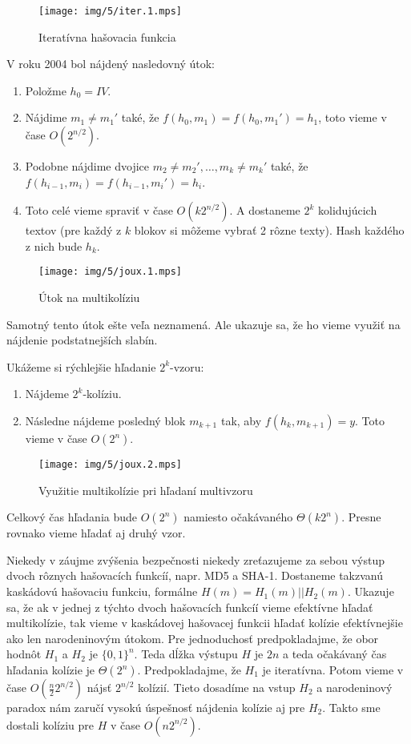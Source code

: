 \begin{figure}[h!]
    \label{fig:iter}
    \centering
    \texttt{[image: img/5/iter.1.mps]}
    \caption{Iteratívna hašovacia funkcia}
\end{figure}


V roku 2004 \cite{Joux04} bol nájdený nasledovný útok:
\begin{enumerate}
\itemsep -1.2mm
\item Položme $h_0 = IV$.
\item Nájdime $m_1 \neq m_1'$ také, že $f(h_0, m_1) = f(h_0, m_1') = h_1$, 
toto vieme v čase $O(2^{n/2})$.
\item Podobne nájdime dvojice $m_2 \neq m_2', \dots, m_k \neq m_k'$ také, 
že $f(h_{i-1}, m_i) = f(h_{i-1}, m_i') = h_i$.
\item Toto celé vieme spraviť v čase $O(k 2^{n/2})$. A dostaneme $2^k$ 
kolidujúcich textov (pre každý z $k$ blokov si môžeme vybrať
2 rôzne texty). Hash každého z nich bude $h_k$.
\end{enumerate}

\begin{figure}[h!]
    \label{fig:joux1}
    \centering
    \texttt{[image: img/5/joux.1.mps]}
    \caption{Útok na multikolíziu}
\end{figure}


Samotný tento útok ešte veľa neznamená. Ale ukazuje sa, že
ho vieme využiť na nájdenie podstatnejších slabín.

Ukážeme si rýchlejšie hľadanie $2^k$-vzoru:
\begin{enumerate}
\itemsep -1.2mm
\item Nájdeme $2^k$-kolíziu.
\item Následne nájdeme posledný blok $m_{k+1}$ tak, aby $f(h_k, m_{k+1}) = y$. Toto vieme v čase $O(2^n)$.
\end{enumerate}

\begin{figure}[h!]
    \label{fig:joux2}
    \centering
    \texttt{[image: img/5/joux.2.mps]}
    \caption{Využitie multikolízie pri hľadaní multivzoru}
\end{figure}

Celkový čas hľadania bude $O(2^n)$ namiesto očakávaného $\Theta(k 2^n)$. Presne rovnako vieme hľadať aj druhý vzor.

Niekedy v záujme zvýšenia bezpečnosti niekedy zreťazujeme za sebou výstup dvoch rôznych hašovacích funkcíí, napr.
MD5 a SHA-1. Dostaneme takzvanú kaskádovú hašovaciu funkciu, formálne $H(m) = H_1(m)||H_2(m)$. 
Ukazuje sa, že ak v jednej z týchto dvoch hašovacích funkcíí vieme efektívne hľadať multikolízie, tak vieme
v kaskádovej hašovacej funkcii hľadať kolízie efektívnejšie ako len narodeninovým útokom.
Pre jednoduchosť predpokladajme, že obor hodnôt $H_1$
a $H_2$ je $\{0,1\}^n$. Teda dĺžka výstupu $H$ je $2n$ a teda očakávaný čas hľadania kolízie je $\Theta(2^n)$.
Predpokladajme, že $H_1$ je iteratívna. Potom vieme v čase $O(\frac{n}{2} 2^{n/2})$ nájsť $2^{n/2}$ kolízií. Tieto dosadíme
na vstup $H_2$ a narodeninový paradox nám zaručí vysokú úspešnosť nájdenia kolízie aj pre $H_2$. Takto sme dostali
kolíziu pre $H$ v čase $O(n 2^{n/2})$.

